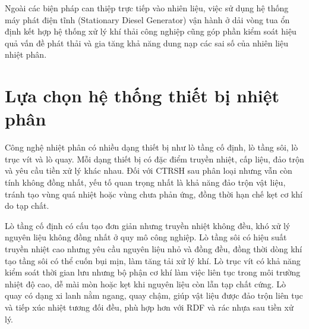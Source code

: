 \documentclass[../main.tex]{subfiles}
\begin{document}
Ngoài các biện pháp can thiệp trực tiếp vào nhiên liệu, việc sử dụng hệ thống máy phát điện tĩnh (Stationary Diesel Generator) vận hành ở dải vòng tua ổn định kết hợp hệ thống xử lý khí thải công nghiệp cũng góp phần kiểm soát hiệu quả vấn đề phát thải và gia tăng khả năng dung nạp các sai số của nhiên liệu nhiệt phân.

\section{Lựa chọn hệ thống thiết bị nhiệt phân}
\label{sec:lua-chon-he-thong-nhiet-phan}

Công nghệ nhiệt phân có nhiều dạng thiết bị như lò tầng cố định, lò tầng sôi, lò trục vít và lò quay. Mỗi dạng thiết bị có đặc điểm truyền nhiệt, cấp liệu, đảo trộn và yêu cầu tiền xử lý khác nhau. Đối với CTRSH sau phân loại nhưng vẫn còn tính không đồng nhất, yếu tố quan trọng nhất là khả năng đảo trộn vật liệu, tránh tạo vùng quá nhiệt hoặc vùng chưa phản ứng, đồng thời hạn chế kẹt cơ khí do tạp chất.

Lò tầng cố định có cấu tạo đơn giản nhưng truyền nhiệt không đều, khó xử lý nguyên liệu không đồng nhất ở quy mô công nghiệp. Lò tầng sôi có hiệu suất truyền nhiệt cao nhưng yêu cầu nguyên liệu nhỏ và đồng đều, đồng thời dòng khí tạo tầng sôi có thể cuốn bụi mịn, làm tăng tải xử lý khí. Lò trục vít có khả năng kiểm soát thời gian lưu nhưng bộ phận cơ khí làm việc liên tục trong môi trường nhiệt độ cao, dễ mài mòn hoặc kẹt khi nguyên liệu còn lẫn tạp chất cứng. Lò quay có dạng xi lanh nằm ngang, quay chậm, giúp vật liệu được đảo trộn liên tục và tiếp xúc nhiệt tương đối đều, phù hợp hơn với RDF và rác nhựa sau tiền xử lý.

\begin{table}[htbp]
\centering
\caption{Đánh giá lựa chọn các dạng lò nhiệt phân cho rác sau xử lý}
\label{tab:lua-chon-lo-nhiet-phan}
\setlength{\tabcolsep}{5pt}
\end{table}
\end{document}
